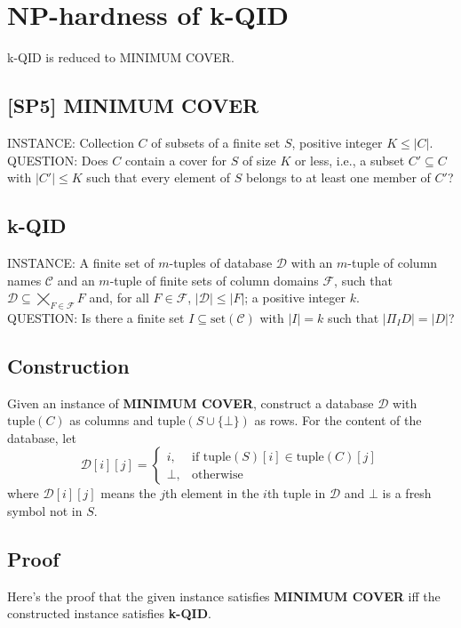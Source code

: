 \documentclass[12pt]{article}
\begin{document}

\section*{NP-hardness of k-QID}
k-QID is reduced to MINIMUM COVER.

\subsection*{[SP5] MINIMUM COVER}
INSTANCE:   Collection $C$ of subsets of a finite set $S$, positive integer $K \leq |C|$.\\
QUESTION:   Does $C$ contain a cover for $S$ of size $K$ or less, i.e., a subset $C' \subseteq C$ with $|C'| \leq K$ such that every element of $S$ belongs to at least one member of $C'$?

\subsection*{k-QID}
INSTANCE: A finite set of $m$-tuples of database $\mathcal{D}$ with an $m$-tuple of column names $\mathcal{C}$ and an $m$-tuple of finite sets of column domains $\mathcal{F}$, such that $\mathcal{D} \subseteq \bigtimes_{F \in \mathcal{F}} F$ and, for all $F \in \mathcal{F}$, $|\mathcal{D}| \leq |F|$; a positive integer $k$.\\
QUESTION: Is there a finite set $I \subseteq \mathrm{set}(\mathcal{C})$ with $|I| = k$ such that $|\Pi_{I} D| = |D|$?

\subsection*{Construction}
Given an instance of \textbf{MINIMUM COVER}, construct a database $\mathcal{D}$ with $\mathrm{tuple}(C)$ as columns and $\mathrm{tuple}(S\cup\{\bot\})$ as rows. For the content of the database, let
$$
\mathcal{D}[i][j] =
\begin{cases}
    i,    &\text{if } \mathrm{tuple}(S)[i] \in \mathrm{tuple}(C)[j]\\
    \bot, &\text{otherwise}
\end{cases}
$$
where $\mathcal{D}[i][j]$ means the $j$th element in the $i$th tuple in $\mathcal{D}$ and $\bot$ is a fresh symbol not in $S$.

\subsection*{Proof}
Here's the proof that the given instance satisfies \textbf{MINIMUM COVER} iff the constructed instance satisfies \textbf{k-QID}.
\end{document}
